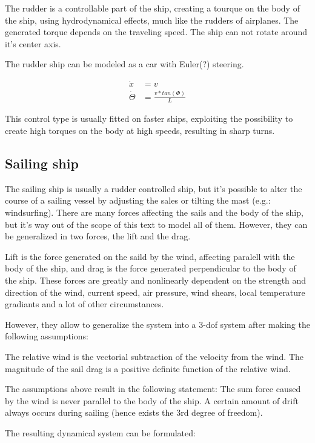 The rudder is a controllable part of the ship, creating a tourque on the body of the ship, using hydrodynamical effects, much like the rudders of airplanes. The generated torque depends on the traveling speed. The ship can not rotate around it’s center axis.

The rudder ship can be modeled as a car with Euler(?) steering.

\begin{align}
	\dot{x} &= v \\
	\dot{\Theta} &= \frac{v * tan(\Phi)}{L}
\end{align}

This control type is usually fitted on faster ships, exploiting the possibility to create high torques on the body at high speeds, resulting in sharp turns.

\subsection{Sailing ship}

The sailing ship is usually a rudder controlled ship, but it’s possible to alter the course of a sailing vessel by adjusting the sales or tilting the mast (e.g.: windsurfing).
There are many forces affecting the sails and the body of the ship, but it’s way out of the scope of this text to model all of them. However, they can be generalized in two forces, the lift and the drag.

Lift is the force generated on the saild by the wind, affecting paralell with the body of the ship, and drag is the force generated perpendicular to the body of the ship. These forces are greatly and nonlinearly dependent on the strength and direction of the wind, current speed, air pressure, wind shears, local temperature gradiants and a lot of other circumstances.

However, they allow to generalize the system into a 3-dof system after making the following assumptions:

The relative wind is the vectorial subtraction of the velocity from the wind.
The magnitude of the sail drag is a positive definite function of the relative wind.

The assumptions above result in the following statement:
The sum force caused by the wind is never parallel to the body of the ship. A certain amount of drift always occurs during sailing (hence exists the 3rd degree of freedom).

The resulting dynamical system can be formulated:

